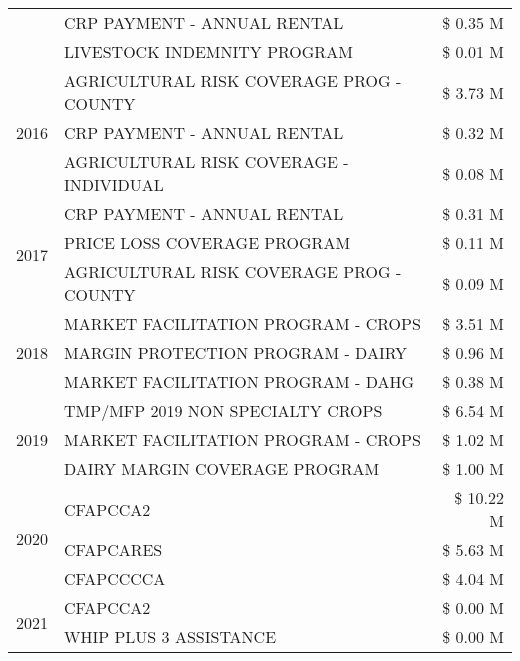 \begin{tabular}{llr}
 & CRP PAYMENT - ANNUAL RENTAL & \$ 0.35 M \\
 & LIVESTOCK INDEMNITY PROGRAM & \$ 0.01 M \\
\cline{1-3}
\multirow[t]{3}{*}{2016} & AGRICULTURAL RISK COVERAGE PROG - COUNTY & \$ 3.73 M \\
 & CRP PAYMENT - ANNUAL RENTAL & \$ 0.32 M \\
 & AGRICULTURAL RISK COVERAGE - INDIVIDUAL & \$ 0.08 M \\
\cline{1-3}
\multirow[t]{3}{*}{2017} & CRP PAYMENT - ANNUAL RENTAL & \$ 0.31 M \\
 & PRICE LOSS COVERAGE PROGRAM & \$ 0.11 M \\
 & AGRICULTURAL RISK COVERAGE PROG - COUNTY & \$ 0.09 M \\
\cline{1-3}
\multirow[t]{3}{*}{2018} & MARKET FACILITATION PROGRAM - CROPS & \$ 3.51 M \\
 & MARGIN PROTECTION PROGRAM - DAIRY & \$ 0.96 M \\
 & MARKET FACILITATION PROGRAM - DAHG & \$ 0.38 M \\
\cline{1-3}
\multirow[t]{3}{*}{2019} & TMP/MFP 2019 NON SPECIALTY CROPS & \$ 6.54 M \\
 & MARKET FACILITATION PROGRAM - CROPS & \$ 1.02 M \\
 & DAIRY MARGIN COVERAGE PROGRAM & \$ 1.00 M \\
\cline{1-3}
\multirow[t]{3}{*}{2020} & CFAPCCA2 & \$ 10.22 M \\
 & CFAPCARES & \$ 5.63 M \\
 & CFAPCCCCA & \$ 4.04 M \\
\cline{1-3}
\multirow[t]{2}{*}{2021} & CFAPCCA2 & \$ 0.00 M \\
 & WHIP PLUS 3 ASSISTANCE & \$ 0.00 M \\
\cline{1-3}
\bottomrule
\end{tabular}
